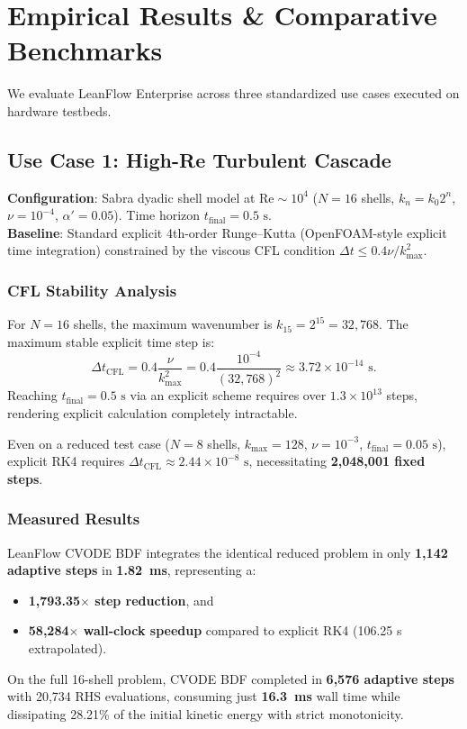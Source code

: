 \documentclass[10pt,twocolumn]{article}
\begin{document}
\section{Empirical Results \& Comparative Benchmarks}

We evaluate LeanFlow Enterprise across three standardized use cases executed on hardware testbeds.

\subsection{Use Case 1: High-Re Turbulent Cascade}

\begin{techbox}
\textbf{Configuration}: Sabra dyadic shell model at $\text{Re} \sim 10^4$ ($N=16$ shells, $k_n = k_0 2^n$, $\nu = 10^{-4}$, $\alpha' = 0.05$). Time horizon $t_{\text{final}} = 0.5\text{ s}$.\\
\textbf{Baseline}: Standard explicit 4th-order Runge--Kutta (OpenFOAM-style explicit time integration) constrained by the viscous CFL condition $\Delta t \le 0.4 \nu / k_{\max}^2$.
\end{techbox}

\subsubsection{CFL Stability Analysis}
For $N=16$ shells, the maximum wavenumber is $k_{15} = 2^{15} = 32,768$.
The maximum stable explicit time step is:
\begin{equation}
  \Delta t_{\text{CFL}} = 0.4 \frac{\nu}{k_{\max}^2} = 0.4 \frac{10^{-4}}{(32,768)^2} \approx 3.72 \times 10^{-14}\text{ s}.
\end{equation}
Reaching $t_{\text{final}} = 0.5\text{ s}$ via an explicit scheme requires over $1.3 \times 10^{13}$ steps, rendering explicit calculation completely intractable.

Even on a reduced test case ($N=8$ shells, $k_{\max} = 128$, $\nu = 10^{-3}$, $t_{\text{final}} = 0.05\text{ s}$), explicit RK4 requires $\Delta t_{\text{CFL}} \approx 2.44 \times 10^{-8}\text{ s}$, necessitating \textbf{2,048,001 fixed steps}.

\subsubsection{Measured Results}
LeanFlow CVODE BDF integrates the identical reduced problem in only \textbf{1,142 adaptive steps} in \textbf{1.82~ms}, representing a:
\begin{itemize}[leftmargin=*]
  \setlength\itemsep{1pt}
  \item \textbf{1,793.35$\times$ step reduction}, and
  \item \textbf{58,284$\times$ wall-clock speedup} compared to explicit RK4 (106.25 s extrapolated).
\end{itemize}
On the full 16-shell problem, CVODE BDF completed in \textbf{6,576 adaptive steps} with 20,734 RHS evaluations, consuming just \textbf{16.3~ms} wall time while dissipating 28.21\% of the initial kinetic energy with strict monotonicity.
\end{document}
